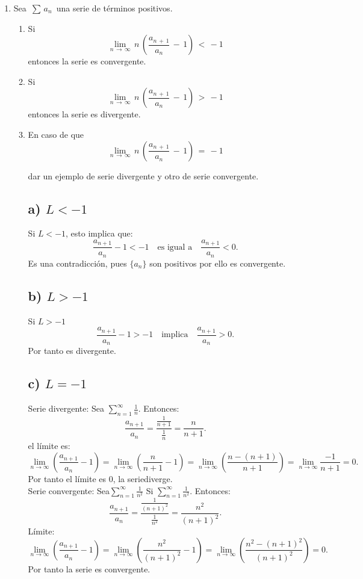 \documentclass{article}
\begin{document}
\begin{enumerate}
Como \( \sum_{n=1}^{\infty} a_n \) es convergente, sabemos que \( n > N \), la serie \( \sum_{n=N}^{\infty} |a_n| \) es convergente.
Ya que \( C \) es una constante implicaría que  \( \sum_{n=N}^{\infty} |a_n| \cdot C \)  es convergente.


\item Sea \,$\sum\,a_n$\, una serie de t\'erminos positivos.
\begin{enumerate}
\item Si
\[
\lim_{n\,\rightarrow\,\infty}\,n\,\left(\frac{a_{n\,+\,1}}{a_n}\,-\,1\right)\,<\,-1
\]
entonces la serie es convergente.
\item Si
\[
\lim_{n\,\rightarrow\,\infty}\,n\,\left(\frac{a_{n\,+\,1}}{a_n}\,-\,1\right)\,>\,-1
\]
entonces la serie es divergente.
\item En caso de que
\[
\lim_{n\,\rightarrow\,\infty}\,n\,\left(\frac{a_{n\,+\,1}}{a_n}\,-\,1\right)\,=\,-1
\]

dar un ejemplo de serie divergente y otro de serie convergente.



\subsection*{ a) \( L < -1 \)}

Si \( L < -1 \), esto implica que:
\[
\frac{a_{n+1}}{a_n} - 1 < -1 \quad \text{es igual a} \quad \frac{a_{n+1}}{a_n} < 0.
\]
Es una contradicción, pues \( \{a_n\} \) son positivos por ello es convergente.

\subsection*{ b) \( L > -1 \)}

Si \( L > -1 \)
\[
\frac{a_{n+1}}{a_n} - 1 > -1 \quad \text{implica} \quad \frac{a_{n+1}}{a_n} > 0.
\]
Por tanto es divergente.

\subsection*{c) \( L = -1 \)}

Serie divergente: 
Sea \( \sum_{n=1}^{\infty} \frac{1}{n} \). Entonces:
\[
\frac{a_{n+1}}{a_n} = \frac{\frac{1}{n+1}}{\frac{1}{n}} = \frac{n}{n+1}.
\]
el límite es:
\[
\lim_{n \to \infty} \left( \frac{a_{n+1}}{a_n} - 1 \right) = \lim_{n \to \infty} \left( \frac{n}{n+1} - 1 \right) = \lim_{n \to \infty} \left( \frac{n - (n+1)}{n+1} \right) = \lim_{n \to \infty} \frac{-1}{n+1} = 0.
\]
Por tanto el límite es 0, la seriediverge.
\\
Serie convergente: 
Sea\( \sum_{n=1}^{\infty} \frac{1}{n^2} \)
Si \( \sum_{n=1}^{\infty} \frac{1}{n^2} \).
Entonces:
\[
\frac{a_{n+1}}{a_n} = \frac{\frac{1}{(n+1)^2}}{\frac{1}{n^2}} = \frac{n^2}{(n+1)^2}.
\]
Límite:
\[
\lim_{n \to \infty} \left( \frac{a_{n+1}}{a_n} - 1 \right) = \lim_{n \to \infty} \left( \frac{n^2}{(n+1)^2} - 1 \right) = \lim_{n \to \infty} \left( \frac{n^2 - (n+1)^2}{(n+1)^2} \right) = 0.
\]
Por tanto la serie es convergente.
\end{enumerate}



\end{enumerate}
\end{document}
